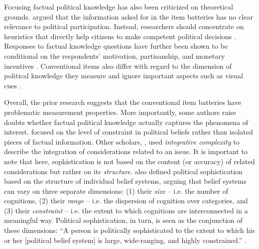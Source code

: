 \documentclass[12pt]{article}
\begin{document}
Focusing factual political knowledge has also been criticized on theoretical grounds. \citet{lupia2006elitism} argued that the information asked for in the item batteries has no clear relevance to political participation. Instead, researchers should concentrate on heuristics that directly help citizens to make competent political decisions \citep[see also][]{lupia1994shortcuts}. Responses to factual knowledge questions have further been shown to be conditional on the respondents' motivation, partisanship, and monetary incentives \citep{prior2008money,bullock2015partisan,prior2015you}. Conventional items also differ with regard to the dimension of political knowledge they measure \citep{barabas2014question} and ignore important aspects such as visual cues \citep{prior2014visual}.

Overall, the prior research suggests that the conventional item batteries have problematic measurement properties. More importantly, some authors raise doubts whether factual political knowledge actually captures the phenomena of interest. \citet{converse1964nature} focused on the level of constraint in political beliefs rather than isolated pieces of factual information. Other scholars, \citet{tetlock1983cognitive}, used \textsl{integrative complexity} to describe the integration of considerations related to an issue. It is important to note that here, sophistication is not based on the content (or accuracy) of related considerations but rather on its \textsl{structure}. \citet{luskin1987measuring} also defined political sophistication based on the structure of individual belief systems, arguing that belief systems can vary on three separate dimensions: (1) their \textsl{size} -- i.e. the number of cognitions, (2) their \textsl{range} -- i.e. the dispersion of cognition over categories, and (3) their \textsl{constraint} -- i.e. the extent to which cognitions are interconnected in a meaningful way. Political sophistication, in turn, is seen as the conjunction of these dimensions: ``A person is politically sophisticated to the extent to which his or her [political belief system] is large, wide-ranging, and highly constrained.'' \citep[860]{luskin1987measuring}.
\end{document}
